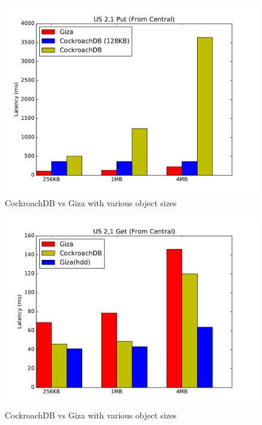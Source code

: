 
\begin{figure}[t]
      \includegraphics[width=\linewidth]{images/cockroach_vs_giza_put}
      \caption{CockroachDB vs Giza with various object sizes}
      \label{fig:eval_cock_put}
\end{figure}


\begin{figure}[t]
      \includegraphics[width=\linewidth]{images/cockroach_vs_giza_get}
      \caption{CockroachDB vs Giza with various object sizes}
      \label{fig:eval_cock_get}
\end{figure}
